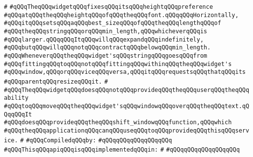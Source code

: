 \verb|#|\newline
\verb|#qQQqTheqQQqwidgetqQQqfixesqQQqitsqQQqheightqQQqpreference|\newline
\verb|#qQQqatqQQqtheqQQqheightqQQqofqQQqtheqQQqfont.qQQqqQQqHorizontally,|\newline
\verb|#qQQqitqQQqsetsqQQqaqQQqbest_sizeqQQqofqQQqtheqQQqlengthqQQqof|\newline
\verb|#qQQqtheqQQqstringqQQqorqQQqmin_length,qQQqwhicheverqQQqis|\newline
\verb|#qQQqlarger.qQQqqQQqItqQQqwillqQQqexpandqQQqindefinitely,|\newline
\verb|#qQQqbutqQQqwillqQQqnotqQQqcontractqQQqbelowqQQqmin_length.|\newline
\verb|#qQQqWheneverqQQqtheqQQqwidget'sqQQqstringqQQqgoesqQQqfrom|\newline
\verb|#qQQqfittingqQQqtoqQQqnotqQQqfittingqQQqwithinqQQqtheqQQqwidget's|\newline
\verb|#qQQqwindow,qQQqorqQQqviceqQQqversa,qQQqitqQQqrequestsqQQqthatqQQqits|\newline
\verb|#qQQqparentqQQqresizeqQQqit.|\newline
\verb|#|\newline
\verb|#qQQqTheqQQqwidgetqQQqdoesqQQqnotqQQqprovideqQQqtheqQQquserqQQqtheqQQqability|\newline
\verb|#qQQqtoqQQqmoveqQQqtheqQQqwidget'sqQQqwindowqQQqoverqQQqtheqQQqtext.qQQqqQQqIt|\newline
\verb|#qQQqdoesqQQqprovideqQQqtheqQQqshift_windowqQQqfunction,qQQqwhich|\newline
\verb|#qQQqtheqQQqapplicationqQQqcanqQQquseqQQqtoqQQqprovideqQQqthisqQQqservice.|\newline
\verb|#|\newline
\newline
\verb|#qQQqCompiledqQQqby:|\newline
\verb|#qQQqqQQqqQQqqQQqqQQq|\newline
\newline
\newline
\newline
\verb|#qQQqThisqQQqapiqQQqisqQQqimplementedqQQqin:|\newline
\verb|#|\newline
\verb|#qQQqqQQqqQQqqQQqqQQq|\newline
